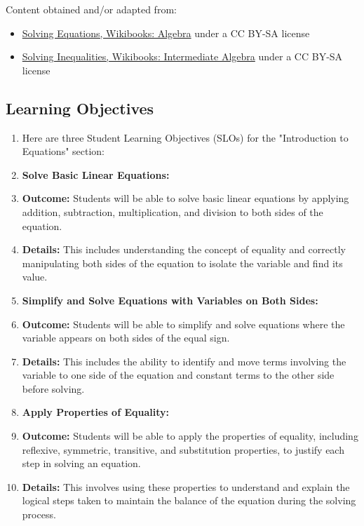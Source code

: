 Content obtained and/or adapted from:



\begin{itemize}
    \item \href{https://en.wikibooks.org/wiki/Algebra/Solving_Equations}{Solving Equations, Wikibooks: Algebra} under a CC BY-SA license
    \item \href{https://en.wikibooks.org/wiki/Intermediate_Algebra/Solving_Inequalities}{Solving Inequalities, Wikibooks: Intermediate Algebra} under a CC BY-SA license
\end{itemize}


\subsection{Learning Objectives}
\label{ssec:lear-fe6e}


\begin{enumerate}
    \item Here are three Student Learning Objectives (SLOs) for the "Introduction to Equations" section:
    \item \textbf{Solve Basic Linear Equations:}
    \item \textbf{Outcome:} Students will be able to solve basic linear equations by applying addition, subtraction, multiplication, and division to both sides of the equation.
    \item \textbf{Details:} This includes understanding the concept of equality and correctly manipulating both sides of the equation to isolate the variable and find its value.
    \item \textbf{Simplify and Solve Equations with Variables on Both Sides:}
    \item \textbf{Outcome:} Students will be able to simplify and solve equations where the variable appears on both sides of the equal sign.
    \item \textbf{Details:} This includes the ability to identify and move terms involving the variable to one side of the equation and constant terms to the other side before solving.
    \item \textbf{Apply Properties of Equality:}
    \item \textbf{Outcome:} Students will be able to apply the properties of equality, including reflexive, symmetric, transitive, and substitution properties, to justify each step in solving an equation.
    \item \textbf{Details:} This involves using these properties to understand and explain the logical steps taken to maintain the balance of the equation during the solving process.
\end{enumerate}


